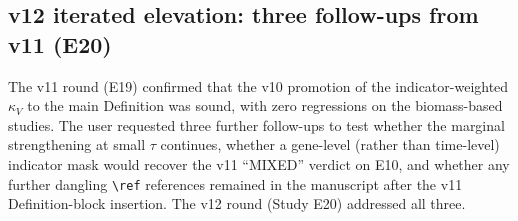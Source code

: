 \documentclass[11pt,a4paper]{article}
\theoremstyle{plain}
\theoremstyle{definition}
\theoremstyle{remark}
\begin{document}
\subsection{v12 iterated elevation: three follow-ups from v11 (E20)}
\label{sec:novelty-v12}

The v11 round (E19) confirmed that the v10 promotion of the indicator-weighted
$\kappa_V$ to the main Definition was sound, with zero regressions on the
biomass-based studies. The user requested three further follow-ups to test
whether the marginal strengthening at small $\tau$ continues, whether a
gene-level (rather than time-level) indicator mask would recover the v11
``MIXED'' verdict on E10, and whether any further dangling
\texttt{\textbackslash ref} references remained in the manuscript after the
v11 Definition-block insertion. The v12 round (Study E20) addressed all three.
\end{document}
